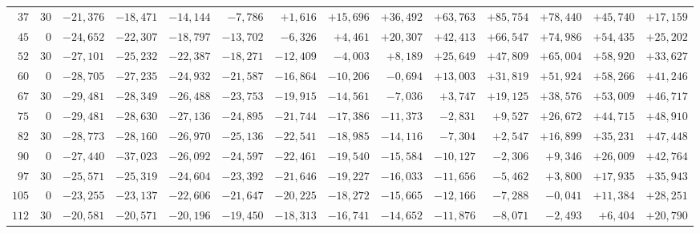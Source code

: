 \begin{landscape}
\begin{longtable}{@{}rr|r|r|r|r|r|r|r|r|r|r|r|r@{}}
\(37\) & \(30\) & \(-21{,}376\) & \(-18{,}471\) & \(-14{,}144\) & \(-7{,}786\) & \(+1{,}616\) & \(+15{,}696\) & \(+36{,}492\) & \(+63{,}763\) & \(+85{,}754\) & \(+78{,}440\) & \(+45{,}740\) & \(+17{,}159\)\\
\(45\) & \(0\) & \(-24{,}652\) & \(-22{,}307\) & \(-18{,}797\) & \(-13{,}702\) & \(-6{,}326\) & \(+4{,}461\) & \(+20{,}307\) & \(+42{,}413\) & \(+66{,}547\) & \(+74{,}986\) & \(+54{,}435\) & \(+25{,}202\)\\
\(52\) & \(30\) & \(-27{,}101\) & \(-25{,}232\) & \(-22{,}387\) & \(-18{,}271\) & \(-12{,}409\) & \(-4{,}003\) & \(+8{,}189\) & \(+25{,}649\) & \(+47{,}809\) & \(+65{,}004\) & \(+58{,}920\) & \(+33{,}627\)\\[2pt]
\(60\) & \(0\) & \(-28{,}705\) & \(-27{,}235\) & \(-24{,}932\) & \(-21{,}587\) & \(-16{,}864\) & \(-10{,}206\) & \(-0{,}694\) & \(+13{,}003\) & \(+31{,}819\) & \(+51{,}924\) & \(+58{,}266\) & \(+41{,}246\)\\
\(67\) & \(30\) & \(-29{,}481\) & \(-28{,}349\) & \(-26{,}488\) & \(-23{,}753\) & \(-19{,}915\) & \(-14{,}561\) & \(-7{,}036\) & \(+3{,}747\) & \(+19{,}125\) & \(+38{,}576\) & \(+53{,}009\) & \(+46{,}717\)\\
\(75\) & \(0\) & \(-29{,}481\) & \(-28{,}630\) & \(-27{,}136\) & \(-24{,}895\) & \(-21{,}744\) & \(-17{,}386\) & \(-11{,}373\) & \(-2{,}831\) & \(+9{,}527\) & \(+26{,}672\) & \(+44{,}715\) & \(+48{,}910\)\\
\(82\) & \(30\) & \(-28{,}773\) & \(-28{,}160\) & \(-26{,}970\) & \(-25{,}136\) & \(-22{,}541\) & \(-18{,}985\) & \(-14{,}116\) & \(-7{,}304\) & \(+2{,}547\) & \(+16{,}899\) & \(+35{,}231\) & \(+47{,}448\)\\[2pt]
\(90\) & \(0\) & \(-27{,}440\) & \(-37{,}023\) & \(-26{,}092\) & \(-24{,}597\) & \(-22{,}461\) & \(-19{,}540\) & \(-15{,}584\) & \(-10{,}127\) & \(-2{,}306\) & \(+9{,}346\) & \(+26{,}009\) & \(+42{,}764\)\\
\(97\) & \(30\) & \(-25{,}571\) & \(-25{,}319\) & \(-24{,}604\) & \(-23{,}392\) & \(-21{,}646\) & \(-19{,}227\) & \(-16{,}033\) & \(-11{,}656\) & \(-5{,}462\) & \(+3{,}800\) & \(+17{,}935\) & \(+35{,}943\)\\
\(105\) & \(0\) & \(-23{,}255\) & \(-23{,}137\) & \(-22{,}606\) & \(-21{,}647\) & \(-20{,}225\) & \(-18{,}272\) & \(-15{,}665\) & \(-12{,}166\) & \(-7{,}288\) & \(-0{,}041\) & \(+11{,}384\) & \(+28{,}251\)\\
\(112\) & \(30\) & \(-20{,}581\) & \(-20{,}571\) & \(-20{,}196\) & \(-19{,}450\) & \(-18{,}313\) & \(-16{,}741\) & \(-14{,}652\) & \(-11{,}876\) & \(-8{,}071\) & \(-2{,}493\) & \(+6{,}404\) & \(+20{,}790\)\\[2pt]

\end{longtable}
\end{landscape}
